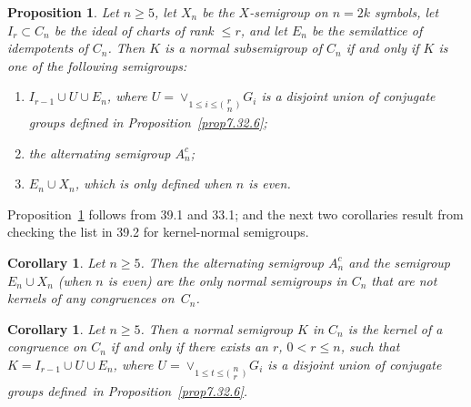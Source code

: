 \documentclass{surv-l}
\numberwithin{equation}{section}
\numberwithin{table}{section}
\numberwithin{figure}{section}
\newtheorem{corollary}[equation]{Corollary}
\newtheorem{proposition}[equation]{Proposition}
\theoremstyle{definition}
\begin{document}
\begin{proposition}\label{prop8.39.2}
Let $n \geq 5$, let $X_{n}$ be the
$X$-semigroup on $n=2k$ symbols, let
$I_{r}\subset C_{n}$ be the ideal of charts of rank $\leq r$, and
let $E_{n}$ be the semilattice of idempotents of $C_{n}$. Then $K$
is a normal subsemigroup of $C_{n}$ if and only if $K$ is one of
the following semigroups:
\begin{enumerate}
\item[(1)] $I_{r-1}\cup U\cup E_{n}$, where $U=\vee_{1\leq
i\leq\big(\!\begin{smallmatrix}{r}\\
{n}\end{smallmatrix}\!\big)}G_{i}$ is a disjoint union of
conjugate groups defined in \emph{Proposition~\ref{prop7.32.6}};

\item[(2)] the alternating semigroup $A_{n}^{c}$;

\item[(3)] $E_{n}\cup X_{n}$, which is only defined when $n$ is even.
\end{enumerate}
\end{proposition}

Proposition~\ref{prop8.39.2} follows from 39.1 and 33.1; and the
next two corollaries result from checking the list in 39.2 for
kernel-normal semigroups.

\begin{corollary}\label{cor8.39.3}
Let $n \geq 5$. Then the alternating semigroup $A_{n}^{c}$ and the
semigroup $E_{n}\cup X_{n}$ (when $n$ is even) are the only normal
semigroups in $C_{n}$ that are not kernels of any
congruences on~$C_{n}$.
\end{corollary}

\begin{corollary}\label{cor8.39.4}
Let $n \geq 5$. Then a normal semigroup $K$ in $C_{n}$ is the
kernel of a congruence on $C_{n}$ if and only if there exists an
$r$, $0<r\leq n$, such that $K=I_{r-1}\cup U\cup E_{n}$, where
$U=\vee_{1\leq t\leq\big(\!\begin{smallmatrix}n\\r\end{smallmatrix}\!\big)}G_{i}$ is a disjoint union of
conjugate groups defined~in \emph{Proposition~\ref{prop7.32.6}}.
\end{corollary}
\end{document}
